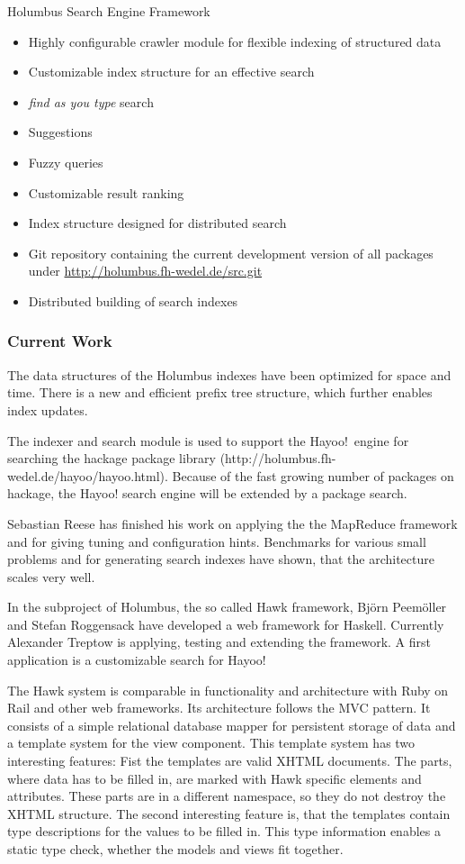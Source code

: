 \begin{hcarentry}[updated]{Holumbus Search Engine Framework}
\begin{itemize}
\item Highly configurable crawler module for flexible indexing of structured data
\item Customizable index structure for an effective search
\item {\em find as you type} search
\item Suggestions
\item Fuzzy queries
\item Customizable result ranking
\item Index structure designed for distributed search
\item Git repository containing the current development version of all packages under
  \url{http://holumbus.fh-wedel.de/src.git}
\item Distributed building of search indexes
\end{itemize}

\subsubsection*{Current Work}

The data structures of the Holumbus indexes have been optimized
for space and time. There is a new and efficient prefix tree structure,
which further enables index updates.

The indexer and search module is used
to support the Hayoo!\ engine for searching the hackage package library
(http://holumbus.fh-wedel.de/hayoo/hayoo.html). Because of the fast growing number
of packages on hackage, the Hayoo! search engine will be extended by a package search.

Sebastian Reese has finished his work on applying the
the MapReduce framework and for giving
tuning and configuration hints. Benchmarks for various small problems
and for generating search indexes have shown, that the architecture
scales very well.

In the subproject of Holumbus, the so called Hawk framework, 
Bj\"orn Peem\"oller and Stefan Roggensack have developed a web framework
for Haskell. Currently Alexander Treptow is applying, testing and extending the
framework. A first application is a customizable search for Hayoo!

The Hawk system is comparable in functionality and architecture with Ruby on Rail
and other web frameworks. Its architecture follows the MVC pattern.
It consists of a simple relational database mapper for persistent storage of data
and a template system for the view component. This template system has two
interesting features: Fist the templates are valid XHTML documents. The parts,
where data has to be filled in, are marked with Hawk specific elements and attributes.
These parts are in a different namespace, so they do not destroy the XHTML structure.
The second interesting feature is, that the templates contain type descriptions for
the values to be filled in. This type information enables a static type check, whether
the models and views fit together.


\end{hcarentry}
